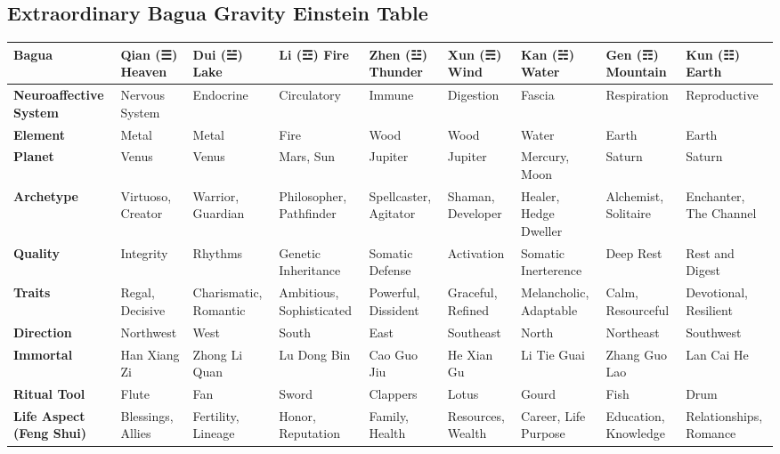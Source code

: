 \documentclass{article}
\begin{document}
\begin{landscape}

\section*{Extraordinary Bagua Gravity Einstein Table}

\begin{longtable}{|p{3.2cm}|p{3.2cm}|p{3.2cm}|p{3.2cm}|p{3.2cm}|p{3.2cm}|p{3.2cm}|p{3.2cm}|p{3.2cm}|}
\hline
\textbf{Bagua} & Qian (☰) Heaven & Dui (☱) Lake & Li (☲) Fire & Zhen (☳) Thunder & Xun (☴) Wind & Kan (☵) Water & Gen (☶) Mountain & Kun (☷) Earth \\
\hline
\textbf{Neuroaffective System} & Nervous System & Endocrine & Circulatory & Immune & Digestion & Fascia & Respiration & Reproductive \\
\textbf{Element} & Metal & Metal & Fire & Wood & Wood & Water & Earth & Earth \\
\textbf{Planet} & Venus & Venus & Mars, Sun & Jupiter & Jupiter & Mercury, Moon & Saturn & Saturn \\
\textbf{Archetype} & Virtuoso, Creator & Warrior, Guardian & Philosopher, Pathfinder & Spellcaster, Agitator & Shaman, Developer & Healer, Hedge Dweller & Alchemist, Solitaire & Enchanter, The Channel \\
\textbf{Quality} & Integrity & Rhythms & Genetic Inheritance & Somatic Defense & Activation & Somatic Inerterence & Deep Rest & Rest and Digest \\
\textbf{Traits} & Regal, Decisive & Charismatic, Romantic & Ambitious, Sophisticated & Powerful, Dissident & Graceful, Refined & Melancholic, Adaptable & Calm, Resourceful & Devotional, Resilient \\
\textbf{Direction} & Northwest & West & South & East & Southeast & North & Northeast & Southwest \\
\textbf{Immortal} & Han Xiang Zi & Zhong Li Quan & Lu Dong Bin & Cao Guo Jiu & He Xian Gu & Li Tie Guai & Zhang Guo Lao & Lan Cai He \\
\textbf{Ritual Tool} & Flute & Fan & Sword & Clappers & Lotus & Gourd & Fish & Drum \\
\textbf{Life Aspect (Feng Shui)} & Blessings, Allies & Fertility, Lineage & Honor, Reputation & Family, Health & Resources, Wealth & Career, Life Purpose & Education, Knowledge & Relationships, Romance \\
\hline
\end{longtable}

\end{landscape}
\end{document}
